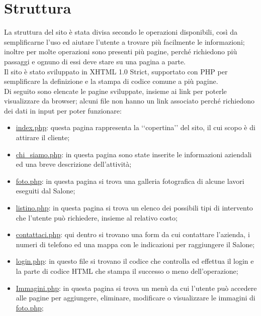 \section{Struttura}{
	La struttura del sito è stata divisa secondo le operazioni disponibili, così da semplificarne l'uso ed aiutare l'utente a trovare più facilmente le informazioni; inoltre per molte operazioni sono presenti più pagine, perché richiedono più passaggi e ognuno di essi deve stare su una pagina a parte.
	\\
	Il sito è stato sviluppato in XHTML 1.0 Strict, supportato con PHP per semplificare la definizione e la stampa di codice comune a più pagine.
	\\
	Di seguito sono elencate le pagine sviluppate, insieme ai link per poterle visualizzare da browser; alcuni file non hanno un link associato perché richiedono dei dati in input per poter funzionare:
	\begin{itemize}\itemsep1pt
		\item \href{http://tecweb2016.studenti.math.unipd.it/smarches/}{index.php}: questa pagina rappresenta la ‘‘copertina’’ del sito, il cui scopo è di attirare il cliente;
		\item \href{http://tecweb2016.studenti.math.unipd.it/smarches/chi\_siamo.php}{chi\_siamo.php}: in questa pagina sono state inserite le informazioni aziendali ed una breve descrizione dell'attività;
		\item \href{http://tecweb2016.studenti.math.unipd.it/smarches/foto.php}{foto.php}: in questa pagina si trova una galleria fotografica di alcune lavori eseguiti dal Salone;
		\item \href{http://tecweb2016.studenti.math.unipd.it/smarches/listino.php}{listino.php}: in questa pagina si trova un elenco dei possibili tipi di intervento che l'utente può richiedere, insieme al relativo costo;
		\item \href{http://tecweb2016.studenti.math.unipd.it/smarches/contattaci.php}{contattaci.php}: qui dentro si trovano una form da cui contattare l'azienda, i numeri di telefono ed una mappa con le indicazioni per raggiungere il Salone;
		\item \href{http://tecweb2016.studenti.math.unipd.it/smarches/login.php}{login.php}: in questo file si trovano il codice che controlla ed effettua il login e la parte di codice HTML che stampa il successo o meno dell'operazione;
		\item \href{http://tecweb2016.studenti.math.unipd.it/smarches/Immagini.php}{Immagini.php}: in questa pagina si trova un menù da cui l'utente può accedere alle pagine per aggiungere, eliminare, modificare o visualizzare le immagini di \href{http://tecweb2016.studenti.math.unipd.it/smarches/foto.php}{foto.php};

\end{itemize}}
